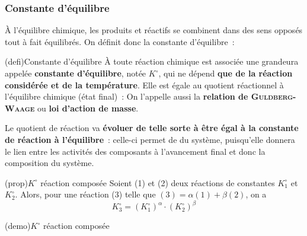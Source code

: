 \documentclass[../../main/main.tex]{subfiles}
\begin{document}
\subsubsection{Constante d'équilibre}
À l'équilibre chimique, les produits et réactifs se combinent dans des sens
opposés tout à fait équilibrés. On définit donc la constante d'équilibre~:

\begin{tcb*}[label=def:K](defi){Constante d'équilibre}
	À toute réaction chimique est associée une grandeura appelée \textbf{constante
		d'équilibre}, notée $K^\circ$, qui ne dépend \textbf{que de la réaction
		considérée et de la température}. Elle est égale au quotient réactionnel à
	l'équilibre chimique (état final)~:
	\psw{%
		\[
			\boxed{K^\circ = Q_{r, \eql}}
		\]
	}%
	On l'appelle aussi la \textbf{relation de \textsc{Guldberg-Waage}} ou
	\textbf{loi d'action de masse}.
\end{tcb*}

Le quotient de réaction va \textbf{évoluer de telle sorte à être égal à la
	constante de réaction à l'équilibre}~: celle-ci permet de  du système, puisqu'elle donnera le lien entre les activités des
composants à l'avancement final et donc la composition du système.

\begin{tcb*}(prop){$K^\circ$ réaction composée}
	Soient (1) et (2) deux réactions de constantes $K_1^\circ$ et $K_2^\circ$.
	Alors, pour une réaction (3) telle que $(3) = \alpha (1) + \beta (2)$, on a
	\[
		\boxed{K_3^\circ = (K_1^\circ)^{\alpha} \cdot (K_2^\circ)^{\beta}}
	\]
\end{tcb*}
\begin{tcb}(demo){$K^\circ$ réaction composée}
	\vspace{-15pt}
	\vspace{-15pt}
\end{tcb}
\end{document}
